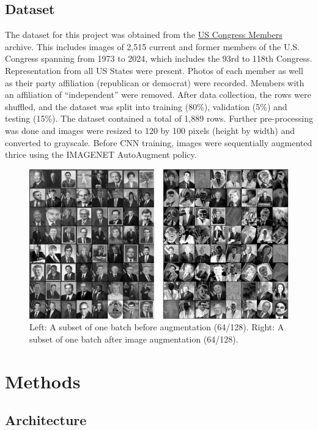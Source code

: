 \documentclass[manuscript,screen,review]{acmart}
\begin{document}
\subsection{Dataset}

The dataset for this project was obtained from the \href{https://www.congress.gov/members}{US Congress Members} archive. This includes images of 2,515 current and former members of the U.S. Congress spanning from 1973 to 2024, which includes the 93rd to 118th Congress. Representation from all US States were present. Photos of each member as well as their party affiliation (republican or democrat) were recorded. Members with an affiliation of ``independent'' were removed. After data collection, the rows were shuffled, and the dataset was split into training (80\%), validation (5\%) and testing (15\%). The dataset contained a total of 1,889 rows. Further pre-processing was done and images were resized to 120 by 100 pixels (height by width) and converted to grayscale. Before CNN training, images were sequentially augmented thrice using the IMAGENET AutoAugment policy. 

\begin{figure}[h]
  \centering
  \includegraphics[width=\linewidth]{../presentation/batch_both.png}
  \caption{Left: A subset of one batch before augmentation (64/128). Right: A subset of one batch after image augmentation (64/128).}
  \label{fig:batch}
\end{figure}

\section{Methods}

\subsection{Architecture}
\end{document}
